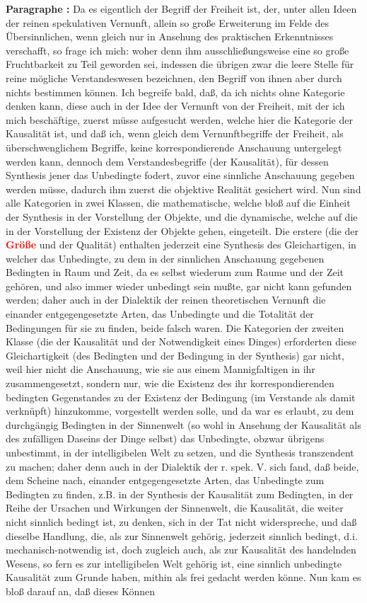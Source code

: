 \documentclass[a4paper,12pt,twoside]{book}
\newcommand{\match}[1]{\textcolor{red}{\textbf{#1}}}
\begin{document}
	\noindent\textbf{Paragraphe : }Da es eigentlich der Begriff der Freiheit ist, der, unter allen Ideen der reinen spekulativen Vernunft, allein so große Erweiterung im Felde des Übersinnlichen, wenn gleich nur in Ansehung des praktischen Erkenntnisses verschafft, so frage ich mich: woher denn ihm ausschließungsweise eine so große Fruchtbarkeit zu Teil geworden sei, indessen die übrigen zwar die leere Stelle für reine mögliche Verstandeswesen bezeichnen, den Begriff von ihnen aber durch nichts bestimmen können. Ich begreife bald, daß, da ich nichts ohne Kategorie denken kann, diese auch in der Idee der Vernunft von der Freiheit, mit der ich mich beschäftige, zuerst müsse aufgesucht werden, welche hier die Kategorie der Kausalität ist, und daß ich, wenn gleich dem Vernunftbegriffe der Freiheit, als überschwenglichem Begriffe, keine korrespondierende Anschauung untergelegt werden kann, dennoch dem Verstandesbegriffe (der Kausalität), für dessen Synthesis jener das Unbedingte fodert, zuvor eine sinnliche Anschauung gegeben werden müsse, dadurch ihm zuerst die objektive Realität gesichert wird. Nun sind alle Kategorien in zwei Klassen, die mathematische, welche bloß auf die Einheit der Synthesis in der Vorstellung der Objekte, und die dynamische, welche auf die in der Vorstellung der Existenz der Objekte gehen, eingeteilt. Die erstere (die der \match{Größe} und der Qualität) enthalten jederzeit eine Synthesis des Gleichartigen, in welcher das Unbedingte, zu dem in der sinnlichen Anschauung gegebenen Bedingten in Raum und Zeit, da es selbst wiederum zum Raume und der Zeit gehören, und also  immer wieder unbedingt sein mußte, gar nicht kann gefunden werden; daher auch in der Dialektik der reinen theoretischen Vernunft die einander entgegengesetzte Arten, das Unbedingte und die Totalität der Bedingungen für sie zu finden, beide falsch waren. Die Kategorien der zweiten Klasse (die der Kausalität und der Notwendigkeit eines Dinges) erforderten diese Gleichartigkeit (des Bedingten und der Bedingung in der Synthesis) gar nicht, weil hier nicht die Anschauung, wie sie aus einem Mannigfaltigen in ihr zusammengesetzt, sondern nur, wie die Existenz des ihr korrespondierenden bedingten Gegenstandes zu der Existenz der Bedingung (im Verstande als damit verknüpft) hinzukomme, vorgestellt werden solle, und da war es erlaubt, zu dem durchgängig Bedingten in der Sinnenwelt (so wohl in Ansehung der Kausalität als des zufälligen Daseins der Dinge selbst) das Unbedingte, obzwar übrigens unbestimmt, in der intelligibelen Welt zu setzen, und die Synthesis transzendent zu machen; daher denn auch in der Dialektik der r. spek. V. sich fand, daß beide, dem Scheine nach, einander entgegengesetzte Arten, das Unbedingte zum Bedingten zu finden, z.B. in der Synthesis der Kausalität zum Bedingten, in der Reihe der Ursachen und Wirkungen der Sinnenwelt, die Kausalität, die weiter nicht sinnlich bedingt ist, zu denken, sich in der Tat nicht widerspreche, und daß dieselbe Handlung, die, als zur Sinnenwelt gehörig, jederzeit sinnlich bedingt, d.i. mechanisch-notwendig ist, doch zugleich auch, als zur Kausalität des handelnden Wesens, so fern es zur intelligibelen Welt gehörig ist, eine sinnlich unbedingte Kausalität zum Grunde haben, mithin als frei gedacht werden könne. Nun kam es bloß darauf an, daß dieses Können 
\end{document}
